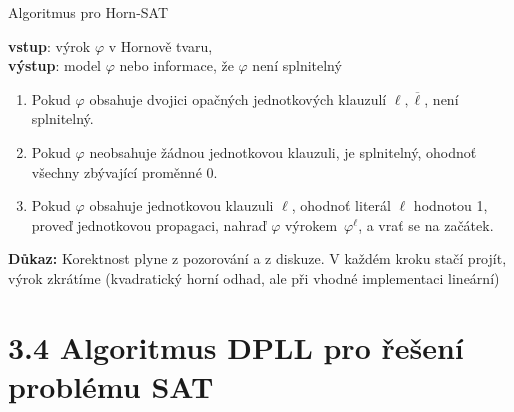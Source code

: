 \documentclass{beamer}
\begin{document}
\begin{frame}{Algoritmus pro Horn-SAT}

    \textbf{vstup}: výrok $\varphi$ v Hornově tvaru,\\ \textbf{výstup}: model $\varphi$ nebo informace, že $\varphi$ není splnitelný
    \begin{enumerate}
        \item Pokud $\varphi$ obsahuje dvojici opačných jednotkových klauzulí $\ell,\overline{\ell}$, není splnitelný.
        \item Pokud $\varphi$ neobsahuje žádnou jednotkovou klauzuli, je splnitelný, ohodnoť všechny zbývající proměnné 0.
        \item Pokud $\varphi$ obsahuje jednotkovou klauzuli $\ell$, ohodnoť literál $\ell$ hodnotou 1, proveď jednotkovou propagaci, nahraď $\varphi$ výrokem~$\varphi^\ell$, a vrať se na začátek.
    \end{enumerate}


    \textbf{Důkaz:} {\small Korektnost plyne z pozorování a z diskuze. V každém kroku stačí projít, výrok zkrátíme (kvadratický horní odhad, ale při vhodné implementaci lineární)}\hfill\qedsymbol

\end{frame}


\section{3.4 Algoritmus DPLL pro řešení problému SAT}
\end{document}
